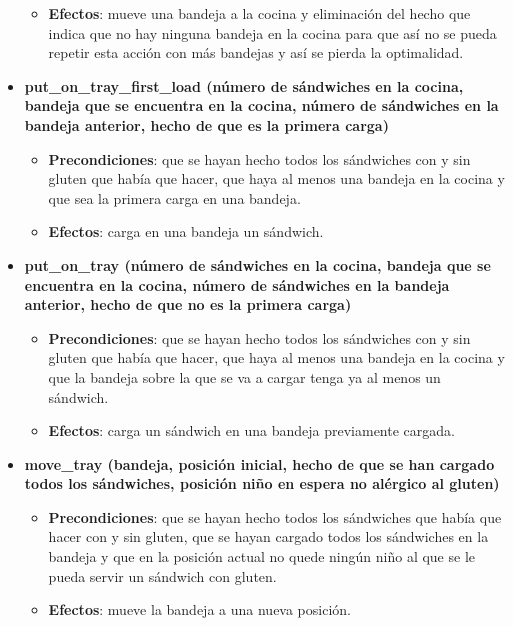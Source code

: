 \documentclass{article}
\begin{document}
\begin{itemize}
\begin{itemize}
                \item \textbf{Efectos}: mueve una bandeja a la cocina y eliminación del hecho que indica que no hay ninguna bandeja en la cocina para que así no se pueda repetir esta acción con más bandejas y así se pierda la optimalidad.
            \end{itemize}
        \item \textbf{put\_on\_tray\_first\_load (número de sándwiches en la cocina, bandeja que se encuentra en la cocina, número de sándwiches en la bandeja anterior, hecho de que es la primera carga)}
            \begin{itemize}
                \item \textbf{Precondiciones}: que se hayan hecho todos los sándwiches con y sin gluten que había que hacer, que haya al menos una bandeja en la cocina y que sea la primera carga en una bandeja.
                \item \textbf{Efectos}: carga en una bandeja un sándwich.            
            \end{itemize}
        \item \textbf{put\_on\_tray (número de sándwiches en la cocina, bandeja que se encuentra en la cocina, número de sándwiches en la bandeja anterior, hecho de que no es la primera carga)}
            \begin{itemize}
                \item \textbf{Precondiciones}: que se hayan hecho todos los sándwiches con y sin gluten que había que hacer, que haya al menos una bandeja en la cocina y que la bandeja sobre la que se va a cargar tenga ya al menos un sándwich.
                \item \textbf{Efectos}: carga un sándwich en una bandeja previamente cargada.
            \end{itemize}        
        \item \textbf{move\_tray (bandeja, posición inicial, hecho de que se han cargado todos los sándwiches, posición niño en espera no alérgico al gluten)}
            \begin{itemize}
                \item \textbf{Precondiciones}: que se hayan hecho todos los sándwiches que había que hacer con y sin gluten, que se hayan cargado todos los sándwiches en la bandeja y que en la posición actual no quede ningún niño al que se le pueda servir un sándwich con gluten.
                \item \textbf{Efectos}: mueve la bandeja a una nueva posición.

\end{itemize}
\end{itemize}
\end{document}
